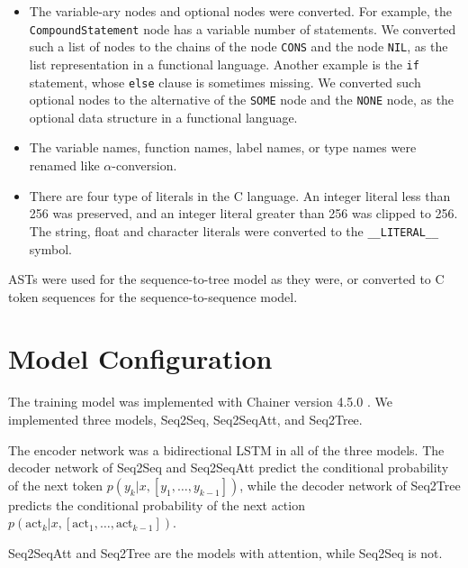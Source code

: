 \documentclass[senior,final,11pt]{iscs-thesis}
\begin{document}
\begin{itemize}
\item The variable-ary nodes and optional nodes were converted. 
For example, the \texttt{CompoundStatement} node has a variable number of statements. 
We converted such a list of nodes to the chains of the node \texttt{CONS} and the node \texttt{NIL}, as the list representation in a functional language.
Another example is the \texttt{if} statement, whose \texttt{else} clause is sometimes missing. 
We converted such optional nodes to the alternative of the \texttt{SOME} node and the \texttt{NONE} node, as the optional data structure in a functional language.
\item The variable names, function names, label names, or type names were renamed like $\alpha$-conversion.
\item There are four type of literals in the C language. 
An integer literal less than 256 was preserved, and an integer literal greater than 256 was clipped to 256.
The string, float and character literals were converted to the \texttt{\_\_LITERAL\_\_} symbol.

\end{itemize}

ASTs were used for the sequence-to-tree model as they were, or converted to C token sequences for the sequence-to-sequence model. 

\section{Model Configuration}
The training model was implemented with Chainer version 4.5.0 \citep{chainer}.
We implemented three models, Seq2Seq, Seq2SeqAtt, and Seq2Tree.

The encoder network was a bidirectional LSTM in all of the three models.
The decoder network of Seq2Seq and Seq2SeqAtt predict the conditional probability of the next token $ p(y_k|x,[y_1,\dots,y_{k-1}]) $,
while the decoder network of Seq2Tree predicts the conditional probability of the next action $ p(\mathrm{act}_{k}|x,[\mathrm{act}_1, \dots, \mathrm{act}_{k-1}]) $.

Seq2SeqAtt and Seq2Tree are the models with attention, while Seq2Seq is not.
\end{document}
